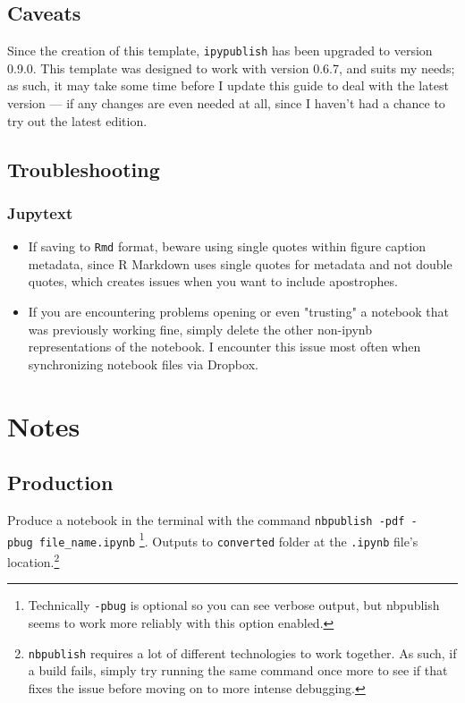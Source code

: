 \documentclass[10pt,parskip=half,
	toc=sectionentrywithdots,
	bibliography=totocnumbered,
	captions=tableheading,
    numbers=noendperiod,
    headings=standardclasses]{scrartcl}
\providecommand{\tightlist}{%
  \setlength{\itemsep}{0pt}\setlength{\parskip}{0pt}}
\begin{document}
\subsection{Caveats}\label{caveats}

Since the creation of this template, \texttt{ipypublish} has been
upgraded to version 0.9.0. This template was designed to work with
version 0.6.7, and suits my needs; as such, it may take some time before
I update this guide to deal with the latest version --- if any changes
are even needed at all, since I haven't had a chance to try out the
latest edition.

\subsection{Troubleshooting}\label{troubleshooting}

\subsubsection{Jupytext}\label{jupytext}

\begin{itemize}
\tightlist
\item
  If saving to \texttt{Rmd} format, beware using single quotes within
  figure caption metadata, since R Markdown uses single quotes for
  metadata and not double quotes, which creates issues when you want to
  include apostrophes.
\item
  If you are encountering problems opening or even "trusting" a notebook
  that was previously working fine, simply delete the other non-ipynb
  representations of the notebook. I encounter this issue most often
  when synchronizing notebook files via Dropbox.
\end{itemize}

\section{Notes}\label{notes}

\subsection{Production}\label{production}

Produce a notebook in the terminal with the command
\texttt{nbpublish\ -pdf\ -pbug\ file\_name.ipynb} \footnote{\hphantom{}
  Technically \texttt{-pbug} is optional so you can see verbose output,
  but nbpublish seems to work more reliably with this option enabled.}.
Outputs to \texttt{converted} folder at the \texttt{.ipynb} file's
location.\footnote{\hphantom{} \texttt{nbpublish} requires a lot of
  different technologies to work together. As such, if a build fails,
  simply try running the same command once more to see if that fixes the
  issue before moving on to more intense debugging.}
\end{document}
